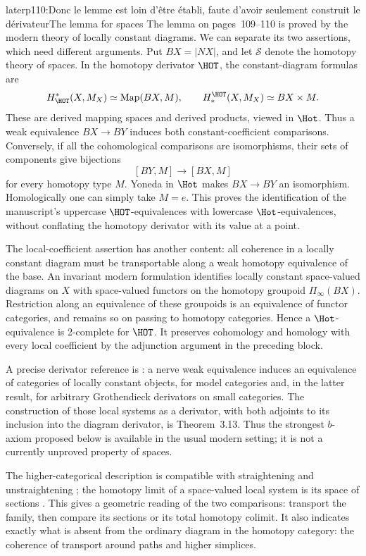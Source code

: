 \begin{dcomment}{later}{p110:Donc le lemme est loin d'être établi, faute d'avoir seulement construit le dérivateur}{The lemma for spaces}
The lemma on pages~109--110 is proved by the modern theory of locally constant diagrams. We can separate its two assertions, which need different arguments. Put $BX=|NX|$, and let $\mathcal S$ denote the homotopy theory of spaces. In the homotopy derivator $\HOT$, the constant-diagram formulas are
\[
 H^*_{\HOT}(X,M_X)\simeq\operatorname{Map}(BX,M),
 \qquad
 H_*^{\HOT}(X,M_X)\simeq BX\times M.
\]
These are derived mapping spaces and derived products, viewed in $\Hot$. Thus a weak equivalence $BX\to BY$ induces both constant-coefficient comparisons. Conversely, if all the cohomological comparisons are isomorphisms, their sets of components give bijections
\[
 [BY,M]\longrightarrow[BX,M]
\]
for every homotopy type $M$. Yoneda in $\Hot$ makes $BX\to BY$ an isomorphism. Homologically one can simply take $M=e$. This proves the identification of the manuscript's uppercase $\HOT$-equivalences with lowercase $\Hot$-equivalences, without conflating the homotopy derivator with its value at a point.

The local-coefficient assertion has another content: all coherence in a locally constant diagram must be transportable along a weak homotopy equivalence of the base. An invariant modern formulation identifies locally constant space-valued diagrams on $X$ with space-valued functors on the homotopy groupoid $\Pi_\infty(BX)$. Restriction along an equivalence of these groupoids is an equivalence of functor categories, and remains so on passing to homotopy categories. Hence a $\Hot$-equivalence is 2-complete for $\HOT$. It preserves cohomology and homology with every local coefficient by the adjunction argument in the preceding block.

A precise derivator reference is \citet[Theorem~1.3 and Corollary~3.8]{Cisinski2009LocallyConstant}: a nerve weak equivalence induces an equivalence of categories of locally constant objects, for model categories and, in the latter result, for arbitrary Grothendieck derivators on small categories. The construction of those local systems as a derivator, with both adjoints to its inclusion into the diagram derivator, is Theorem~3.13. Thus the strongest $b$-axiom proposed below is available in the usual modern setting; it is not a currently unproved property of spaces.

The higher-categorical description is compatible with straightening and unstraightening \citep[Theorem~2.2.1.2]{Lurie2009HTT}; the homotopy limit of a space-valued local system is its space of sections \citep[Corollary~3.3.3.4]{Lurie2009HTT}. This gives a geometric reading of the two comparisons: transport the family, then compare its sections or its total homotopy colimit. It also indicates exactly what is absent from the ordinary diagram in the homotopy category: the coherence of transport around paths and higher simplices.


\end{dcomment}

